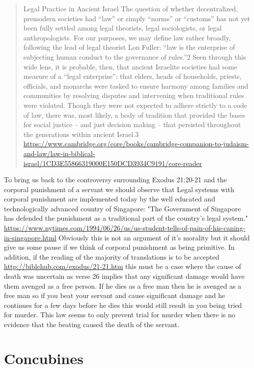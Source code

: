 \documentclass[11pt]{article}
\begin{document}
\begin{quote}
Legal Practice in Ancient Israel
The question of whether decentralized, premodern societies had “law” or simply “norms” or “customs” has not yet been fully settled among legal theorists, legal sociologists, or legal anthropologists. For our purposes, we may define law rather broadly, following the lead of legal theorist Lon Fuller: “law is the enterprise of subjecting human conduct to the governance of rules.”2 Seen through this wide lens, it is probable, then, that ancient Israelite societies had some measure of a “legal enterprise”: that elders, heads of households, priests, officials, and monarchs were tasked to ensure harmony among families and communities by resolving disputes and intervening when traditional rules were violated. Though they were not expected to adhere strictly to a code of law, there was, most likely, a body of tradition that provided the bases for social justice – and just decision making – that persisted throughout the generations within ancient Israel.3 \url{https://www.cambridge.org/core/books/cambridge-companion-to-judaism-and-law/law-in-biblical-israel/1CD3E55866319000E150DCD3934C9191/core-reader}
\end{quote} 

To bring us back to the controversy surrounding Exodus 21:20-21 and the corporal punishment of a servant we should observe that Legal systems with corporal punishment are implemented today by the well educated and technologically advanced country of Singapore: "The Government of Singapore has defended the punishment as a traditional part of the country's legal system." \url{https://www.nytimes.com/1994/06/26/us/us-student-tells-of-pain-of-his-caning-in-singapore.html} Obviously this is not an argument of it's morality but it should give us some pause if we think of corporal punishment as being primitive. In addition, if the reading of the majority of translations is to be accepted \url{http://biblehub.com/exodus/21-21.htm} this must be a case where the cause of death was uncertain as verse 26 implies that any significant damage would have them avenged as a free person. If he dies as a free man then he is avenged as a free man so if you beat your servant and cause significant damage and he continues for a few days before he dies this would still result in you being tried for murder. This law seems to only prevent trial for murder when there is no evidence that the beating caused the death of the servant.


\section{Concubines}
\end{document}
